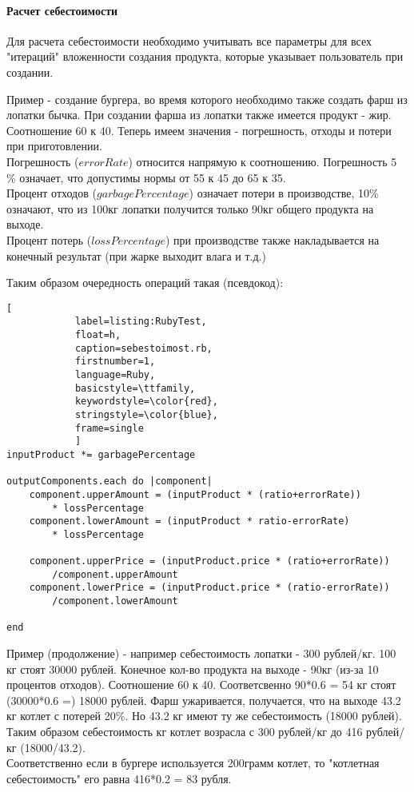 \documentclass[DIV=calc, paper=a4, fontsize=11pt]{scrartcl} %
\begin{document}
\paragraph{Расчет себестоимости}
Для расчета себестоимости необходимо учитывать все параметры для всех "итераций" вложенности создания продукта, которые указывает пользователь при создании. 
\begin{framed}
	Пример - создание бургера, во время которого необходимо также создать фарш из лопатки бычка. При создании фарша из лопатки также имеется продукт - жир. Соотношение 60 к 40. Теперь имеем значения - погрешность, отходы и потери при приготовлении.
	\\[0.5cm]
	Погрешность ($errorRate$) относится напрямую к соотношению. Погрешность 5 \% означает, что допустимы нормы от 55 к 45 до 65 к 35.
	\\[0.5cm]
	Процент отходов ($garbagePercentage$) означает потери в производстве, 10\% означают, что из 100кг лопатки получится только 90кг общего продукта на выходе.
	\\[0.5cm]
	Процент потерь ($lossPercentage$) при производстве также накладывается на конечный результат (при жарке выходит влага и т.д.)
	\end{framed}
	Таким образом очередность операций такая (псевдокод):
		\begin{lstlisting}[
		    label=listing:RubyTest,
		    float=h,
    		caption=sebestoimost.rb,
		    firstnumber=1,
		    language=Ruby,
		    basicstyle=\ttfamily,
		    keywordstyle=\color{red},
		    stringstyle=\color{blue},
		    frame=single
			]
inputProduct *= garbagePercentage

outputComponents.each do |component|
	component.upperAmount = (inputProduct * (ratio+errorRate)) 
		* lossPercentage
	component.lowerAmount = (inputProduct * ratio-errorRate)
		* lossPercentage
	
	component.upperPrice = (inputProduct.price * (ratio+errorRate))
		/component.upperAmount
	component.lowerPrice = (inputProduct.price * (ratio-errorRate))
		/component.lowerAmount

end
		\end{lstlisting}

\begin{framed}
	Пример (продолжение) - например себестоимость лопатки - 300 рублей/кг. 100 кг стоят 30000 рублей. Конечное кол-во продукта на выходе - 90кг (из-за 10 процентов отходов). Соотношение 60 к 40. Соответсвенно 90*0.6 = 54 кг стоят (30000*0.6 =) 18000 рублей. Фарш ужаривается, получается, что на выходе 43.2 кг котлет с потерей 20\%. Но 43.2 кг имеют ту же себестоимость (18000 рублей). Таким образом себестоимость кг котлет возрасла с 300 рублей/кг до 416 рублей/кг (18000/43.2).
	\\[0.5cm]
	Соответственно если в бургере используется 200грамм котлет, то "котлетная себестоимость" его равна 416*0.2 = 83 рубля.
\end{framed}
\end{document}
